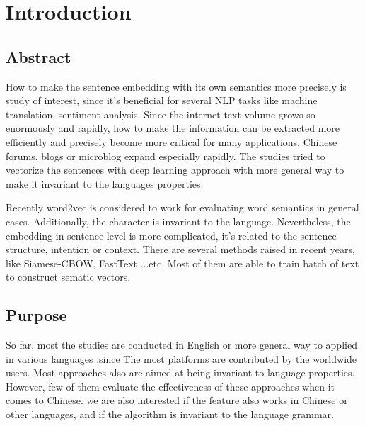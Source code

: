 \chapter{Introduction}
\setlength{\baselineskip}{1.5em}
\setlength{\parindent}{2em}
\setlength{\parskip}{1em}

\section{Abstract}

How to make the sentence embedding with its own semantics more precisely is study of interest, since it's beneficial for several NLP tasks like machine translation, sentiment analysis. 
Since the internet text volume grows so enormously and rapidly, how to make the information can be extracted more efficiently and precisely become more critical for many applications.  
Chinese forums, blogs or microblog expand especially rapidly. The studies tried to vectorize the sentences with deep learning approach with more general way to make it invariant to the languages properties.  


Recently word2vec\cite{word2vec} is considered to work for evaluating word semantics in general cases.  
Additionally, the character is invariant to the language. Nevertheless, 
the embedding in sentence level is more complicated, it's related to the sentence structure,  
intention or context. There are several methods raised in recent years, like Siamese-CBOW, FastText ...etc. 
Most of them are able to train batch of text to construct sematic vectors.

\section{Purpose}

So far, most the studies are conducted in English or more general way to applied in various languages
,since The most platforms are contributed by the worldwide users. Most approaches also are aimed at being invariant to language properties. 
However, few of them evaluate the effectiveness of these approaches when it comes to Chinese.   
we are also interested if the feature also works in Chinese or other languages, and if the algorithm is invariant to the language grammar. 